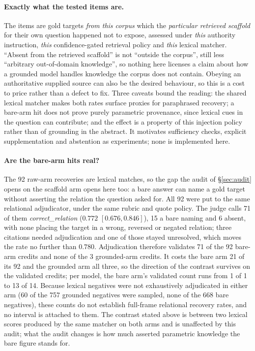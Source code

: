 \documentclass[10pt,twocolumn]{article}
\begin{document}
\paragraph{Exactly what the tested items are.} The items are gold targets \emph{from this corpus} which the \emph{particular retrieved scaffold} for their own question happened not to expose, assessed under \emph{this} authority instruction, \emph{this} confidence-gated retrieval policy and \emph{this} lexical matcher. ``Absent from the retrieved scaffold'' is not ``outside the corpus'', still less ``arbitrary out-of-domain knowledge'', so nothing here licenses a claim about how a grounded model handles knowledge the corpus does not contain. Obeying an authoritative supplied source can also be the desired behaviour, so this is a cost to price rather than a defect to fix. Three caveats bound the reading: the shared lexical matcher makes both rates surface proxies for paraphrased recovery; a bare-arm hit does not prove purely parametric provenance, since lexical cues in the question can contribute; and the effect is a property of this injection policy rather than of grounding in the abstract. It motivates sufficiency checks, explicit supplementation and abstention as experiments; none is implemented here.

\paragraph{Are the bare-arm hits real?} The 92 raw-arm recoveries are lexical matches, so the gap the audit of \S\ref{sec:audit} opens on the scaffold arm opens here too: a bare answer can name a gold target without asserting the relation the question asked for. All 92 were put to the same relational adjudicator, under the same rubric and quote policy. The judge calls 71 of them \emph{correct\_relation} ($0.772$ $[0.676,0.846]$), 15 a bare naming and 6 absent, with none placing the target in a wrong, reversed or negated relation; three citations needed adjudication and one of those stayed unresolved, which moves the rate no further than $0.780$. Adjudication therefore validates 71 of the 92 bare-arm credits and none of the 3 grounded-arm credits. It costs the bare arm 21 of its 92 and the grounded arm all three, so the direction of the contrast survives on the validated credits; per model, the bare arm's validated count runs from 1 of 1 to 13 of 14. Because lexical negatives were not exhaustively adjudicated in either arm (60 of the 757 grounded negatives were sampled, none of the 668 bare negatives), these counts do not establish full-frame relational recovery rates, and no interval is attached to them. The contrast stated above is between two lexical scores produced by the same matcher on both arms and is unaffected by this audit; what the audit changes is how much asserted parametric knowledge the bare figure stands for.
\end{document}
